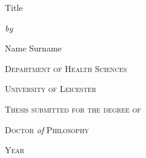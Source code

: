 \begin{titlepage}
	\begin{center}
		\doublespacing
		\vspace*{3em}
		{	\Huge
			Title \par
		}
		\vspace*{0.5em}
		\textit{by} \par
		\vspace*{0.5em}
		{	\LARGE
			Name Surname \par
		}
		\vfill
		\textsc{Department of Health Sciences} \par
		\textsc{University of Leicester} \par
		\vspace*{1.5em}
		\textsc{Thesis submitted for the degree of} \par
		\textsc{Doctor} \textit{of} \textsc{Philosophy} \par
		\vspace*{1.5em}
		{	\Large
			\textsc{Year}
		}
	\end{center}
\end{titlepage}
